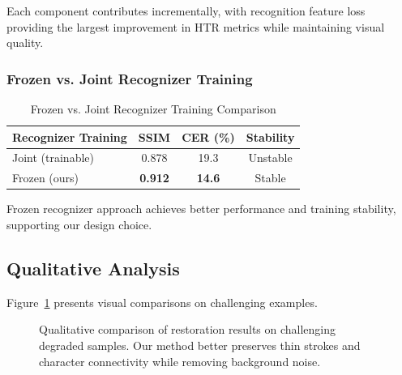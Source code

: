 \documentclass[journal]{IEEEtran}
\begin{document}
Each component contributes incrementally, with recognition feature loss providing the largest improvement in HTR metrics while maintaining visual quality.

\subsubsection{Frozen vs. Joint Recognizer Training}

\begin{table}[!t]
\renewcommand{\arraystretch}{1.3}
\caption{Frozen vs. Joint Recognizer Training Comparison}
\label{table_ablation_recognizer}
\centering
\begin{tabular}{|l|c|c|c|}
\hline
\textbf{Recognizer Training} & \textbf{SSIM} & \textbf{CER (\%)} & \textbf{Stability} \\
\hline
Joint (trainable) & 0.878 & 19.3 & Unstable \\
Frozen (ours) & \textbf{0.912} & \textbf{14.6} & Stable \\
\hline
\end{tabular}
\end{table}

Frozen recognizer approach achieves better performance and training stability, supporting our design choice.

\subsection{Qualitative Analysis}

Figure~\ref{fig:qualitative_results} presents visual comparisons on challenging examples.

\begin{figure}[!t]
\centering
\caption{Qualitative comparison of restoration results on challenging degraded samples. Our method better preserves thin strokes and character connectivity while removing background noise.}
\label{fig:qualitative_results}
\end{figure}
\end{document}
